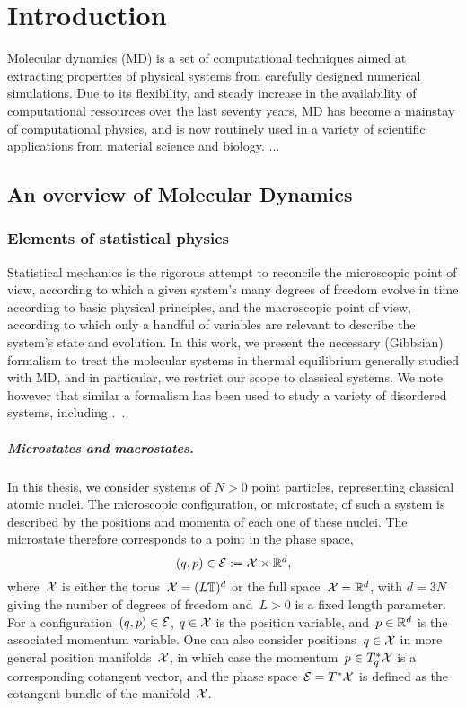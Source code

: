 \chapter{Introduction}
\label{chap:introduction}

Molecular dynamics (MD) is a set of computational techniques aimed at extracting properties of physical systems from carefully designed numerical simulations.
Due to its flexibility, and steady increase in the availability of computational ressources over the last seventy years, MD has become a mainstay of computational physics, and is now routinely used in a variety of scientific applications from material science and biology.
...

\section{An overview of Molecular Dynamics}

\subsection{Elements of statistical physics}
Statistical mechanics is the rigorous attempt to reconcile the microscopic point of view, according to which a given system's many degrees of freedom evolve in time according to basic physical principles, and the macroscopic point of view, according to which only a handful of variables are relevant to describe the system's state and evolution.
In this work, we present the necessary (Gibbsian) formalism to treat the molecular systems in thermal equilibrium generally studied with MD, and in particular, we restrict our scope to classical systems.
We note however that similar a formalism has been used to study a variety of disordered systems, including .~.

\paragraph{Microstates and macrostates.}
In this thesis, we consider systems of $N>0$ point particles, representing classical atomic nuclei.
The microscopic configuration, or microstate, of such a system is described by the positions and momenta of each one of these nuclei. The microstate therefore corresponds to a point in the phase space, 
\begin{equation}
    \label{eq:01:phase_space}
    (q,p)\in \mathcal{E} := \mathcal{X}\times \mathbb{R}^d,
\end{equation}
where~$\mathcal{X}$ is either the torus~$\mathcal{X} = (L\mathbb{T})^d$ or the full space~$\mathcal{X}=\mathbb{R}^d$, with $d=3N$ giving the number of degrees of freedom and~$L>0$ is a fixed length parameter.
For a configuration~$(q,p)\in\mathcal{E}$, $q\in\mathcal{X}$ is the position variable, and~$p\in \mathbb{R}^d$ is the associated momentum variable.
One can also consider positions~$q\in\mathcal{X}$ in more general position manifolds~$\mathcal{X}$, in which case the momentum~$p\in T_q^*\mathcal{X}$ is a corresponding cotangent vector, and the phase space~$\mathcal{E}=T^*\mathcal{X}$ is defined as the cotangent bundle of the manifold~$\mathcal{X}$.

